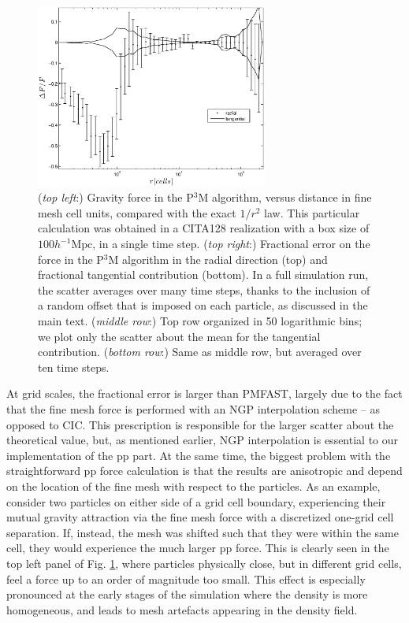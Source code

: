 \documentclass[useAMS,usenatbib]{mn2e}
\begin{document}
\begin{figure}
\begin{center}
    \includegraphics[width=3.0in]{graphs/DeltaF_pp0_N10.eps}
  \caption{({\it top left}:) Gravity force in the P$^3$M algorithm, versus distance in fine mesh cell units, compared with the exact $1/r^{2}$ law.
    This particular calculation was obtained in a CITA128 realization with  a box size of $100 h^{-1}\mbox{Mpc}$,
    in a single time step. 
    ({\it top right}:) Fractional error on the force in the P$^3$M algorithm in the radial direction (top) and fractional tangential contribution (bottom).
  In a full simulation run, the scatter averages over many time steps, 
    thanks to the inclusion of a random offset that is imposed on each particle, as discussed in the main text.
    ({\it middle row}:) Top row organized in 50 logarithmic bins; we plot only the scatter about the mean for the tangential contribution.  
    ({\it bottom row}:) Same as middle row, but averaged over ten time steps.
    \label{fig:den_force_fracErr}}
\end{center}
\end{figure}

At grid scales, the fractional error is larger than {\small PMFAST}, largely due to the fact that the fine mesh force is performed with an NGP interpolation scheme -- as opposed to CIC. This prescription is responsible for the larger scatter about the theoretical value, but, as mentioned earlier, 
NGP interpolation is essential to our implementation of the pp part.
At the same time, the biggest problem with the straightforward pp force calculation is that the results 
are anisotropic and depend on the location of the fine mesh with respect 
to the particles. As an example, consider two particles on either side of a grid 
cell boundary, experiencing their mutual gravity attraction via the fine mesh force with a discretized one-grid cell separation.
 If, instead, the mesh was shifted such that they were
within the same cell, they would experience the much larger pp force. 
This is clearly seen in the top left panel of Fig. \ref{fig:den_force_fracErr}, where particles physically close, but in different grid cells, 
feel a force up to an order of magnitude too small.
This effect is especially pronounced at the early stages of the simulation where
the density is more homogeneous, and leads to mesh artefacts appearing
in the density field.
\end{document}
